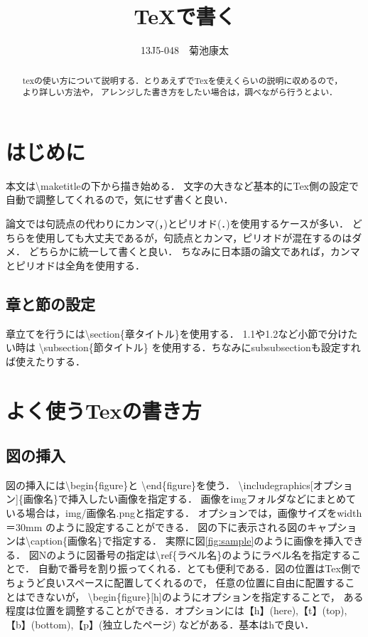 \documentclass[a4j, twocolumn]{jsarticle}
\title{TeXで書く}
\author{13J5-048　菊池康太}
\date{}
\begin{document}
\begin{abstract}
texの使い方について説明する．とりあえずでTexを使えくらいの説明に収めるので，より詳しい方法や，
アレンジした書き方をしたい場合は，調べながら行うとよい．
\end{abstract}
\maketitle

\section{はじめに}
\label{sec:introduction}
本文は\textbackslash maketitleの下から描き始める．
文字の大きなど基本的にTex側の設定で自動で調整してくれるので，気にせず書くと良い．

論文では句読点の代わりにカンマ(，)とピリオド(．)を使用するケースが多い．
どちらを使用しても大丈夫であるが，句読点とカンマ，ピリオドが混在するのはダメ．
どちらかに統一して書くと良い．
ちなみに日本語の論文であれば，カンマとピリオドは全角を使用する．


\subsection{章と節の設定}
章立てを行うには\textbackslash section\{章タイトル\}を使用する．
1.1や1.2など小節で分けたい時は
\textbackslash subsection\{節タイトル\}
を使用する．ちなみにsubsubsectionも設定すれば使えたりする．




\section{よく使うTexの書き方}
\subsection{図の挿入}
図の挿入には\textbackslash begin\{figure\}と
\textbackslash end\{figure\}を使う．
\textbackslash includegraphics[オプション]\{画像名\}で挿入したい画像を指定する．
画像をimgフォルダなどにまとめている場合は，img/画像名.pngと指定する．
オプションでは，画像サイズをwidth＝30mm のように設定することができる．
図の下に表示される図のキャプションは\textbackslash caption\{画像名\}で指定する．
実際に図\ref{fig:sample}のように画像を挿入できる．
図Nのように図番号の指定は\textbackslash ref\{ラベル名\}のようにラベル名を指定することで．
自動で番号を割り振ってくれる．とても便利である．図の位置はTex側でちょうど良いスペースに配置してくれるので，
任意の位置に自由に配置することはできないが，
\textbackslash begin\{figure\}[h]のようにオプションを指定することで，
ある程度は位置を調整することができる．オプションには【h】(here),【t】(top),
【b】(bottom),【p】(独立したページ) などがある．基本はhで良い．
\end{document}
